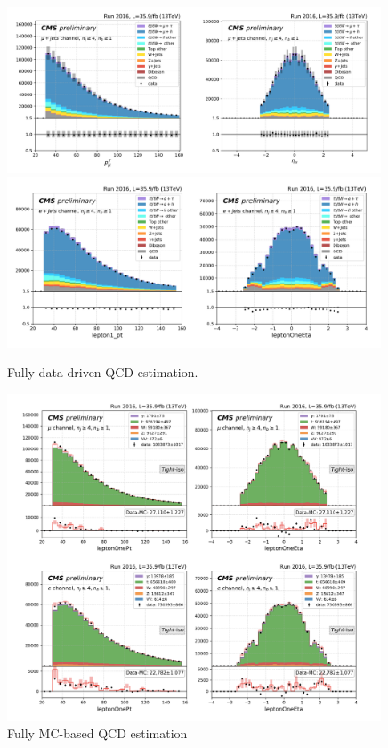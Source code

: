 \begin{figure}
    \centering
    \includegraphics[width=0.99\textwidth]{chapters/Appendix/sectionQCD/figures/application/mu4j_SFNorm_ddShape.png}
    \includegraphics[width=0.99\textwidth]{chapters/Appendix/sectionQCD/figures/application/e4j_SFNorm_ddShape.png}
    \caption{Fully data-driven QCD estimation.}
    \label{fig:app:QCD:application_SFNorm_ddShape}
\end{figure}

\begin{figure}
    \centering
    \includegraphics[width=0.99\textwidth]{chapters/Appendix/sectionQCD/figures/application/mcQCD.png}
    \caption{Fully MC-based QCD estimation}
    \label{fig:app:QCD:application_mc}
\end{figure}

